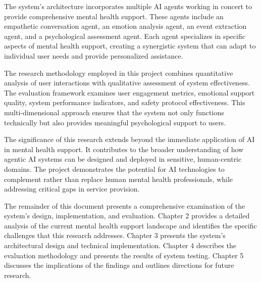 The system's architecture incorporates multiple AI agents working in concert to provide comprehensive mental health support. These agents include an empathetic conversation agent, an emotion analysis agent, an event extraction agent, and a psychological assessment agent. Each agent specializes in specific aspects of mental health support, creating a synergistic system that can adapt to individual user needs and provide personalized assistance.

The research methodology employed in this project combines quantitative analysis of user interactions with qualitative assessment of system effectiveness. The evaluation framework examines user engagement metrics, emotional support quality, system performance indicators, and safety protocol effectiveness. This multi-dimensional approach ensures that the system not only functions technically but also provides meaningful psychological support to users.

The significance of this research extends beyond the immediate application of AI in mental health support. It contributes to the broader understanding of how agentic AI systems can be designed and deployed in sensitive, human-centric domains. The project demonstrates the potential for AI technologies to complement rather than replace human mental health professionals, while addressing critical gaps in service provision.

The remainder of this document presents a comprehensive examination of the system's design, implementation, and evaluation. Chapter 2 provides a detailed analysis of the current mental health support landscape and identifies the specific challenges that this research addresses. Chapter 3 presents the system's architectural design and technical implementation. Chapter 4 describes the evaluation methodology and presents the results of system testing. Chapter 5 discusses the implications of the findings and outlines directions for future research. 